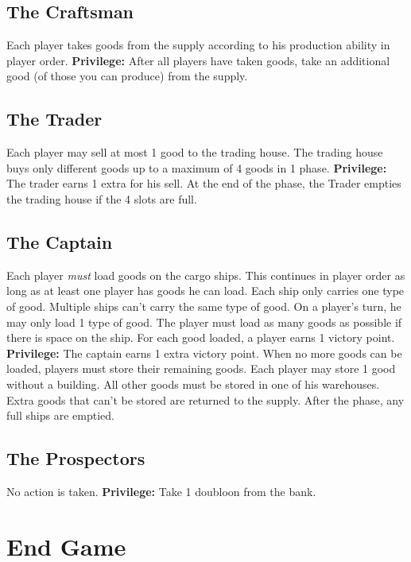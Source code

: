 \documentclass[12pt]{article}
\begin{document}
\begin{multicols*}{2}
\subsection*{The Craftsman}
Each player takes goods from the supply according to his production ability in player order. \textbf{Privilege:} After all players have taken goods, take an additional good (of those you can produce) from the supply.

\subsection*{The Trader}
Each player may sell at most 1 good to the trading house. The trading house buys only different goods up to a maximum of 4 goods in 1 phase. \textbf{Privilege:} The trader earns 1 extra for his sell. At the end of the phase, the Trader empties the trading house if the 4 slots are full.

\subsection*{The Captain}
Each player \emph{must} load goods on the cargo ships. This continues in player order as long as at least one player has goods he can load. Each ship only carries one type of good. Multiple ships can't carry the same type of good. On a player's turn, he may only load 1 type of good. The player must load as many goods as possible if there is space on the ship. For each good loaded, a player earns 1 victory point. \textbf{Privilege:} The captain earns 1 extra victory point. When no more goods can be loaded, players must store their remaining goods. Each player may store 1 good without a building. All other goods must be stored in one of his warehouses. Extra goods that can't be stored are returned to the supply. After the phase, any full ships are emptied.

\subsection*{The Prospectors}
No action is taken. \textbf{Privilege:} Take 1 doubloon from the bank.

\section*{End Game}

\end{multicols*}
\end{document}
